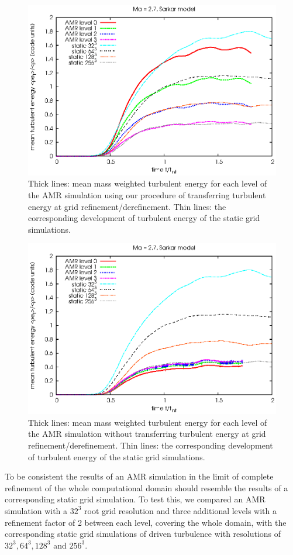 \begin{figure}[p]
\centering
\includegraphics[width=0.7\linewidth]{chapter7/eturbamr27trs2sar.eps}
\caption{Thick lines: mean mass weighted turbulent energy for each level of the
 AMR simulation using our procedure of transferring turbulent energy at grid
refinement/derefinement. Thin lines: the corresponding development of turbulent
energy of the static grid simulations.}
\label{fig:amrtrs2}
\end{figure}

\begin{figure}[p]
\centering
\includegraphics[width=0.7\linewidth]{chapter7/eturbamr27trs0sar.eps}
\caption{Thick lines: mean mass weighted turbulent energy for each level of the
 AMR simulation without transferring turbulent energy at grid 
refinement/derefinement. Thin lines: the corresponding development of turbulent
energy of the static grid simulations.}
\label{fig:amrtrs0}
\end{figure}

To be consistent the results of an AMR simulation in the limit of
complete refinement of the whole computational domain should resemble the
results of a corresponding static grid simulation. To test this, we compared
an AMR simulation with a $32^3$ root grid resolution and three additional
levels with a refinement factor of 2 between each level, covering the whole
domain, with the corresponding static grid simulations of driven turbulence with
resolutions of $32^3,64^3,128^3$ and $256^3$. 

